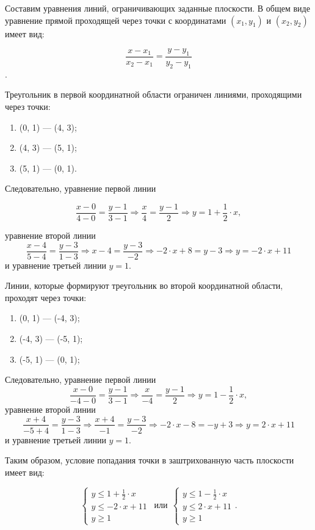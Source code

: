 Составим уравнения линий, ограничивающих заданные плоскости. В общем виде уравнение прямой проходящей через точки с
координатами  $(x_1,y_1)$ и  $(x_2,y_2)$  имеет вид:

 $$\frac{x-x_1}{x_2-x_1}=\frac{y-y_1}{y_2-y_1}$$.

Треугольник в первой координатной области ограничен линиями, проходящими через точки:

\begin{enumerate}
\item (0, 1) — (4, 3);
\item (4, 3) — (5, 1);
\item (5, 1) — (0, 1).
\end{enumerate}
Следовательно, уравнение первой линии

 $$\frac{x-0}{4-0}=\frac{y-1}{3-1}\Rightarrow \frac{x}{4}=\frac{y-1}{2}\Rightarrow y=1+\frac{1}{2}\cdot x,$$

уравнение второй линии
$$
\frac{x-4}{5-4}=\frac{y-3}{1-3}\Rightarrow x-4=\frac{y-3}{-2}\Rightarrow -2\cdot x+8=y-3\Rightarrow y=-2\cdot x+11
$$
и уравнение третьей линии  $y=1$.

Линии, которые формируют треугольник во второй координатной области, проходят через точки:

\begin{enumerate}
\item (0, 1) — (-4, 3);
\item (-4, 3) — (-5, 1);
\item (-5, 1) — (0, 1);
\end{enumerate}
Следовательно, уравнение первой линии
 $$\frac{x-0}{-4-0}=\frac{y-1}{3-1}\Rightarrow \frac{x}{-4}=\frac{y-1}{2}\Rightarrow y=1-\frac{1}{2}\cdot x,$$
уравнение второй линии
$$
\frac{x+4}{-5+4}=\frac{y-3}{1-3}\Rightarrow \frac{x+4}{-1}=\frac{y-3}{-2}\Rightarrow -2\cdot x-8=-y+3\Rightarrow
y=2\cdot x+11
$$
и уравнение третьей линии  $y=1$.

Таким образом, условие попадания точки в заштрихованную часть плоскости имеет вид:

\begin{equation*}
\left\{
\begin{array}{c}
y\leqslant 1+\frac{1}{2}\cdot x\\
y\leqslant -2\cdot x+11\\
y\geqslant 1
\end{array}%
\right.
\ \ \text{или}\ \  
\left\{
\begin{array}{c}
y\leqslant 1-\frac{1}{2}\cdot x\\
y\leqslant 2\cdot x+11\\
y\geqslant 1
\end{array}
\right. .
\end{equation*}

